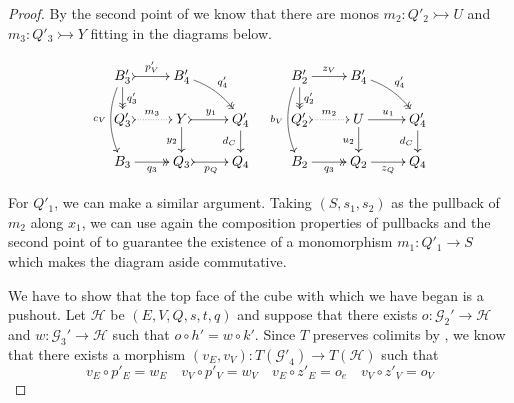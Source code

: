 \documentclass[a4paper,UKenglish,cleveref,pdftex,thm-restate,numberwithinsect]{lipics-v2021}
\def\B{\textbf {\textup{B}}}
\newcommand{\commentato}[1]{ {} }
\newcommand{\mto}{\rightarrowtail}
\begin{document}
\begin{proof}
	By the second point of  we know that there are monos $m_2\colon Q'_2\mto U$ and $m_3\colon Q'_3\mto Y$  fitting in the diagrams below.
	
	\[\xymatrix@R=15pt{B'_3 \ar@{>>}[d]^{q'_3} \ar@/_.3cm/[dd]_{c_V} \ar@{>->}[r]^{p'_V}& B'_4 \ar@/^.2cm/@{>>}[dr]^{q'_4} & & B'_2 \ar[r]^{z_V} \ar@{>>}[d]^{q'_2} \ar@/_.3cm/[dd]_{b_V}& B'_4 \ar@/^.2cm/@{>>}[dr]^{q'_4}\\ Q'_3 \ar@{>.>}[r]^{m_3}& Y  \ar@{>->}[r]^{y_1} \ar[d]_{y_2}& Q'_4 \ar[d]_{d_C}& Q'_2 \ar@{>.>}[r]^{m_2} & U \ar[d]_{u_2} \ar[r]^{u_1} & Q'_4 \ar[d]_{d_C} \\ B_3 \ar@{>>}[r]_{q_3} & Q_3 \ar@{>->}[r]_{p_Q} & Q_4 &B_2 \ar@{>>}[r]_{q_3} & Q_2 \ar[r]_{z_Q} & Q_4}\]

	\noindent 
	\parbox{8.5cm}{\hspace{15pt}
	For $Q'_1$, we can make a similar argument. Taking $(S, s_1, s_2)$ as the pullback of $m_2$ along $x_1$, we can use again the composition properties of pullbacks and the second point of  to guarantee the existence of a monomorphism $m_1\colon Q'_1\to S$ which makes the diagram aside commutative.}\hfill
	\parbox{4cm}{}

We have to show that the top face of the cube with which we have began is a pushout. Let $\mathcal{H}$ be $(E, V, Q, s, t, q)$ and suppose that there exists  $o\colon  \mathcal{G}_2' \to \mathcal{H}$ and $w\colon  \mathcal{G}_3' \to \mathcal{H}$ such that $o \circ h' = w \circ k'$. Since $T$ preserves colimits by , we know that there exists a morphism $(v_E, v_V)\colon T(\mathcal{G'}_4)\to T(\mathcal{H})$ such that
\[v_E\circ p'_E=w_E \quad v_V\circ p'_V=w_V \quad v_E\circ z'_E=o_e \quad v_V\circ z'_V=o_V\]

\commentato{\xymatrix@C=10pt@R=6pt{
		&B_1'\ar@{>>}[dd]|\hole_(.65){q_1'}\ar@{>->}[rr]^{h_V'} \ar[dl]_(.6){k_V'} && B_2' \ar@{>>}[dd]|\hole_(.65){q_2'} \ar[dl]_(.6){z_V'}\ar[dr]^{o_V}\\
		B_3'  \ar@{>>}[dd]_{q_3'}\ar@{>->}[rr]^(.7){p_V'} & & B_4' \ar@{>>}[dd]_(.3){q_4'} \ar[rr]^(.7){v_V}&&  V\ar[dd]^{q}\\
		&Q_1'\ar@{>->}[rr]|\hole^(.65){h'_Q} \ar[dl]_{k'_Q} && Q_2' \ar[dl]^(.4){z_Q'}\ar[dr]^{o_Q}\\
		Q'_3 \ar@{>->}[rr]_{p_Q'} & & Q'_4\ar@{.>}[rr]_{v_C} && Q
}}


\end{proof}
\end{document}
